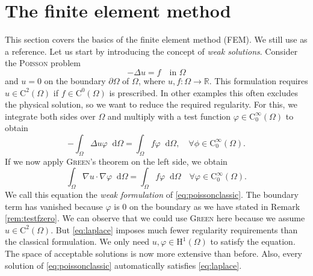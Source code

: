 \documentclass[12pt,a4paper,twoside, open=right]{scrreprt}
\theoremstyle{definition}
\theoremstyle{plain}
\newcommand{\rr}{\mathbb{R}}
\newcommand{\D}{\mathop{}\!\mathrm{d}}
\begin{document}
\section{The finite element method}
\label{sec:fem}
This section covers the basics of the finite element method (FEM). We still use \cite{Ganesan2017} as a reference.
Let us start by introducing the concept of \emph{weak solutions}. Consider the \textsc{Poisson} problem
\begin{equation}
\label{eq:poissonclassic}
    -\Delta u = f \quad \text{in }\Omega
\end{equation}
and $u=0$ on the boundary $\partial\Omega$ of $\Omega$, where $u,f\colon \Omega\to\rr$. This formulation requires $u\in \mathrm{C}^2(\Omega)$ if $f\in\mathrm{C}^0(\Omega)$ is prescribed. In other examples this often excludes the physical solution, so we want to reduce the required regularity. For this, we integrate both sides over $\Omega$ and multiply with a test function $\varphi\in \mathrm{C}^\infty_0(\Omega)$ to obtain
\begin{equation}
    -\int_\Omega \Delta u\varphi\D\Omega =\int_\Omega f\varphi\D\Omega,\quad\forall\phi\in\mathrm{C}^\infty_0(\Omega).
\end{equation}
If we now apply \textsc{Green}'s theorem on the left side, we obtain
\begin{equation}
    \int_\Omega \nabla u\cdot\nabla \varphi\D\Omega = \int_\Omega f\varphi\D\Omega \quad\forall\varphi\in \mathrm{C}^\infty_0(\Omega)\label{eq:laplace}.
\end{equation}
We call this equation the \emph{weak formulation} of \eqref{eq:poissonclassic}.
The boundary term has vanished because $\varphi$ is 0 on the boundary as we have stated in Remark \ref{rem:testfzero}.
We can observe that we could use \textsc{Green} here because we assume $u\in \mathrm{C}^2(\Omega)$. But \eqref{eq:laplace} imposes much fewer regularity requirements than the
classical formulation. We only need $u,\varphi\in\mathrm{H}^1(\Omega)$ to satisfy the equation. The space of acceptable solutions is now more extensive than before. Also, every solution of \eqref{eq:poissonclassic} automatically satisfies \eqref{eq:laplace}.
\end{document}

